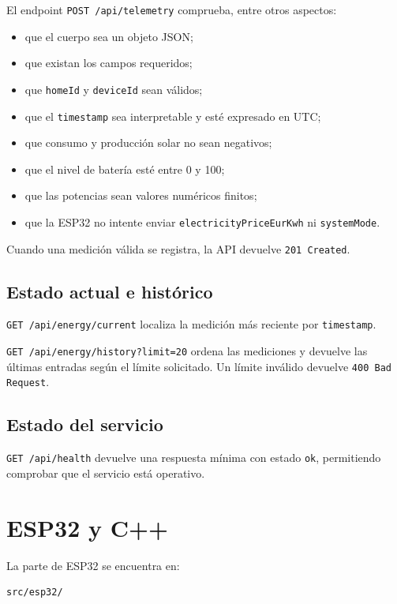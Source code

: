 \documentclass[11pt,a4paper,oneside]{report}
\begin{document}
El endpoint \texttt{POST /api/telemetry} comprueba, entre otros aspectos:

\begin{itemize}
\item que el cuerpo sea un objeto JSON;
\item que existan los campos requeridos;
\item que \texttt{homeId} y \texttt{deviceId} sean válidos;
\item que el \texttt{timestamp} sea interpretable y esté expresado en UTC;
\item que consumo y producción solar no sean negativos;
\item que el nivel de batería esté entre 0 y 100;
\item que las potencias sean valores numéricos finitos;
\item que la ESP32 no intente enviar \texttt{electricityPriceEurKwh} ni \texttt{systemMode}.
\end{itemize}

Cuando una medición válida se registra, la API devuelve \texttt{201 Created}.

\subsection{Estado actual e histórico}

\texttt{GET /api/energy/current} localiza la medición más reciente por \texttt{timestamp}.

\texttt{GET /api/energy/history?limit=20} ordena las mediciones y devuelve las últimas entradas según el límite solicitado. Un límite inválido devuelve \texttt{400 Bad Request}.

\subsection{Estado del servicio}

\texttt{GET /api/health} devuelve una respuesta mínima con estado \texttt{ok}, permitiendo comprobar que el servicio está operativo.

\section{ESP32 y C++}

La parte de ESP32 se encuentra en:

\begin{verbatim}
src/esp32/
\end{verbatim}
\end{document}
